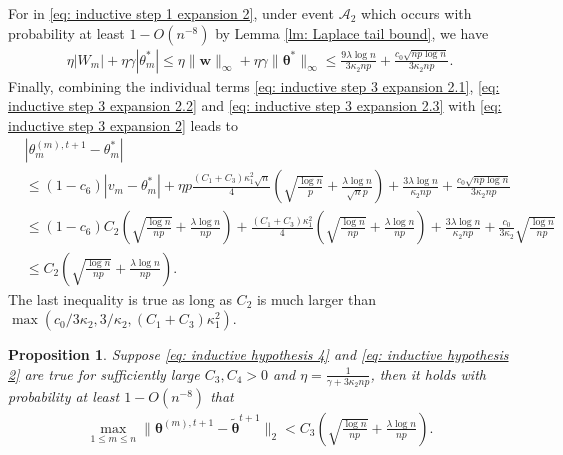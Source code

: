\documentclass[letterpaper,12pt]{article}
\newcommand*\circled[1]{\tikz[baseline=(char.base)]{
		\node[shape=circle, draw, inner sep=1pt, 
	 	minimum height=12pt] (char) {#1};}}
\numberwithin{equation}{section}
\theoremstyle{plain}
\numberwithin{Theorem}{section}
\numberwithin{corollary}{section}
\newtheorem{proposition}{Proposition}
\numberwithin{proposition}{section}
\numberwithin{Lemma}{section}
{
	\theoremstyle{definition}
	\newtheorem{Definition}{Definition}
	\newtheorem{example}{Example}
	\numberwithin{example}{section}
	\newtheorem{fact}{Fact}
	\numberwithin{fact}{section}
	\newtheorem{remark}{Remark}
}
\newcommand{\1}{\mathbbm{1}}
\def\bth{{\boldsymbol{\theta}}}
\begin{document}
	For \circled{3} in \eqref{eq: inductive step 1 expansion 2}, under event $\mathcal A_2$ which occurs with probability at least $1 - O(n^{-8})$ by Lemma \ref{lm: Laplace tail bound}, we have
	\begin{align}
		\eta |W_m| + \eta\gamma|\theta^*_m| \leq \eta\|\bm w\|_\infty + \eta\gamma\|\bth^*\|_\infty \leq \frac{9\lambda\log n}{3\kappa_2np} + \frac{c_0\sqrt{np\log n}}{3\kappa_2np}. \label{eq: inductive step 3 expansion 2.3}
	\end{align}
	Finally, combining the individual terms \eqref{eq: inductive step 3 expansion 2.1}, \eqref{eq: inductive step 3 expansion 2.2} and \eqref{eq: inductive step 3 expansion 2.3} with \eqref{eq: inductive step 3 expansion 2} leads to
	\begin{align*}
		&\left|\theta^{(m), t+1}_m - \theta^*_m\right| \\
		&\leq (1 - c_6)|v_m - \theta^*_m| + \eta p \frac{(C_1 + C_3)\kappa^2_1\sqrt{n}}{4} \left(\sqrt{\frac{\log n}{p}} + \frac{\lambda\log n}{\sqrt{n}p}\right) + \frac{3\lambda\log n}{\kappa_2 np} + \frac{c_0\sqrt{np\log n}}{3\kappa_2 np} \\
		& \leq (1 - c_6)C_2\left(\sqrt{\frac{\log n}{np}} + \frac{\lambda\log n}{np}\right) + \frac{(C_1 + C_3)\kappa_1^2}{4}\left(\sqrt{\frac{\log n}{np}} + \frac{\lambda\log n}{np}\right) + \frac{3\lambda\log n}{\kappa_2 np} + \frac{c_0}{3\kappa_2}\sqrt{\frac{\log n}{np}} \\
		& \leq C_2\left(\sqrt{\frac{\log n}{np}} + \frac{\lambda\log n}{np}\right).
	\end{align*}
	The last inequality is true as long as $C_2$ is much larger than $\max(c_0/3\kappa_2, 3/\kappa_2, (C_1 + C_3)\kappa_1^2)$.


\begin{proposition}\label{prop: inductive step 4}
	Suppose \eqref{eq: inductive hypothesis 4} and \eqref{eq: inductive hypothesis 2} are true for sufficiently large $C_3, C_4 > 0$ and $\eta = \frac{1}{\gamma + 3\kappa_2 np}$, then it holds with probability at least $1 - O(n^{-8})$ that
	\begin{align}
		\max_{1 \leq m \leq n}\|\bth^{(m), t+1} - \widetilde\bth^{t+1}\|_2 < C_3\left(\sqrt{\frac{\log n}{np}} + \frac{\lambda\log n}{np}\right). \label{eq: inductive step 4}
	\end{align}
\end{proposition}
\end{document}
